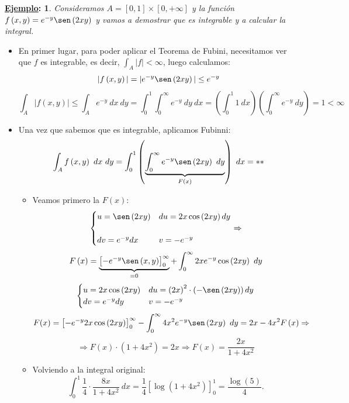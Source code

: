 \documentclass[10pt,a4paper,openright]{book}
\theoremstyle{break}
\newtheorem*{ej}{\underline{Ejemplo}:}
\newcommand{\dif}[1]{\ d#1}
\begin{document}
\begin{ej}
Consideramos $A = \left[0, 1\right] \times \left[0, +\infty\right]$ y la función $f \left(x, y\right) = e^{-y} \sen \left(2xy\right)$ y vamos a demostrar que es integrable y a calcular la integral.
\end{ej}

\begin{itemize}
    \item En primer lugar, para poder aplicar el Teorema de Fubini, necesitamos ver que $f$ es integrable, es decir, $\int_A \vert f\vert < \infty$, luego calculamos:
    $$\vert f \left(x, y\right)\vert = \vert e^{-y} \sen \left(2xy\right)\vert \le e^{-y}$$
    $$\int_A \vert f \left(x, y\right) \vert \le \int_A e^{-y} \dif{x} \dif{y} = \int_0^1 \int_0^{\infty} e^{-y} \dif{y} \dif{x} = \left(\int_0^1 1 \dif{x}  \right) \left(\int_0^{\infty} e^{-y} \dif{y} \right) = 1 < \infty $$
\item Una vez que sabemos que es integrable, aplicamos Fubinni:
    $$\int_A f \left(x, y\right) \dif{x} \dif{y} = \int_0^1 \left(\underbrace{\int_0^{\infty} e^{-y}\sen\left(2xy\right) \dif{y}}_{F \left(x\right)} \right) \dif{x}  = **$$
    \begin{itemize}
    	\item Veamos primero la $F \left(x\right)$:
    $$\begin{cases}
        u = \sen \left(2xy\right) & du = 2x \cos \left(2xy\right)dy \\\\
        dv = e^{-y}dx & v = -e^{-y}
    \end{cases} \Rightarrow$$
    $$F \left(x\right) = \underbrace{\left[-e^{-y} \sen \left(x, y\right)\right]_{0}^{\infty}}_{= 0} + \int_0^{\infty} 2xe^{-y}\cos \left(2xy\right) \dif{y}$$
    $$\begin{cases}
        u = 2x\cos \left(2xy\right) & du = \left(2x\right)^2 \cdot \left(-\sen \left(2xy\right)\right)dy \\
        dv = e^{-y}dy & v = -e^{-y}
    \end{cases}$$
    $$F(x)=\left[-e^{-y}2x \cos \left(2xy\right)\right]_{0}^{\infty} - \int_0^{\infty} 4x^2e^{-y}\sen \left(2xy\right) \dif{y} = 2x - 4x^2 F \left(x\right)\Rightarrow$$
    $$\Rightarrow F \left(x\right) \cdot \left(1 + 4x^2\right) = 2x \Rightarrow F \left(x\right) = \frac{2x}{1+4x^2}$$
    	\item Volviendo a la integral original:
    $$\int_0^1 \frac{1}{4} \cdot \frac{8x}{1+4x^2} \dif{x} = \frac{1}{4} \left[\log \left(1 + 4x^2\right)\right]_{0}^{1} = \frac{\log \left(5\right)}{4}.$$
    \end{itemize}
\end{itemize}
\end{document}
